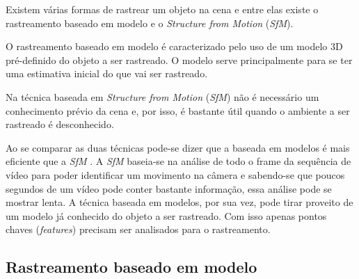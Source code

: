 Existem várias formas de rastrear um objeto na cena \cite{teichrieb2007survey} e entre elas existe o rastreamento baseado em modelo e o \emph{Structure from Motion} (\emph{SfM}).

O rastreamento baseado em modelo é caracterizado pelo uso de um modelo 3D pré-definido do objeto a ser rastreado. O modelo serve principalmente para se ter uma estimativa inicial do que vai ser rastreado.

Na técnica baseada em \emph{Structure from Motion} (\emph{SfM}) \cite{teichrieb2007survey} não é necessário um conhecimento prévio da cena e, por isso, é bastante útil quando o ambiente a ser rastreado é desconhecido.

Ao se comparar as duas técnicas pode-se dizer que a baseada em modelos é mais eficiente que a \emph{SfM} \cite{drummondecipolla}. A \emph{SfM} baseia-se na análise de todo o frame da sequência de vídeo para poder identificar um movimento na câmera e sabendo-se que poucos segundos de um vídeo pode conter bastante informação, essa análise pode se mostrar lenta. A técnica baseada em modelos, por sua vez, pode tirar proveito de um modelo já conhecido do objeto a ser rastreado. Com isso apenas pontos chaves (\emph{features}) precisam ser analisados para o rastreamento.


\subsection{Rastreamento baseado em modelo}

